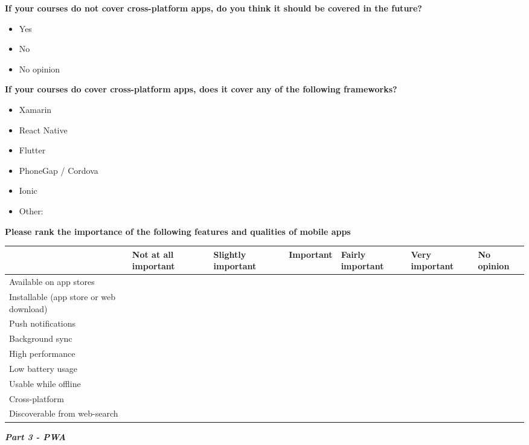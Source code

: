 \documentclass[a4paper,12pt]{article}
\begin{document}
\textbf{If your courses do not cover cross-platform apps, do you think it should be covered in the future?}
\begin{itemize}
    \item Yes
    \item No
    \item No opinion
\end{itemize}

\textbf{If your courses do cover cross-platform apps, does it cover any of the following frameworks?}
\begin{itemize}
    \item Xamarin
    \item React Native
    \item Flutter
    \item PhoneGap / Cordova
    \item Ionic
    \item Other:
\end{itemize}

\textbf{Please rank the importance of the following features and qualities of mobile apps}

\begin{tabular}{|p{3cm}|p{1.7cm}|p{1.7cm}|p{1.6cm}|p{1.7cm}|p{1.6cm}|p{1.4cm}|}
  \hline
     & Not at all important  & Slightly important  &  Important & Fairly important  & Very important  & No opinion \\
  \hline
  Available on app stores   &   &   &   &   &   &  \\
  \hline
  Installable (app store or web download)   &   &   &   &   &   & \\
  \hline
   Push notifications  &   &   &   &   &   & \\
  \hline
   Background sync   &   &   &   &   &   & \\
  \hline
   High performance  &   &   &   &   &   & \\
  \hline
   Low battery usage  &   &   &   &   &   & \\
  \hline
   Usable while offline &   &   &   &   &   & \\
  \hline
   Cross-platform  &   &   &   &   &   & \\
  \hline
   Discoverable from web-search  &   &   &   &   &   & \\
  \hline
\end{tabular}

\quad

\quad

\textbf{\textit{Part 3 - PWA}}
\end{document}
